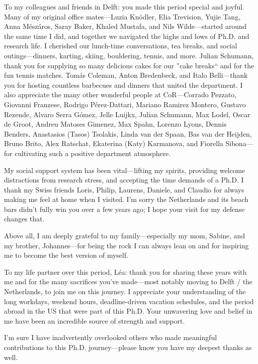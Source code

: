 To my colleagues and friends in Delft: you made this period special and joyful. Many of my original office mates—Luzia Knödler, Elia Trevision, Yujie Tang, Anna Mészáros, Saray Baker, Khaled Mustafa, and Nils Wilde—started around the same time I did, and together we navigated the highs and lows of Ph.D. and research life. I cherished our lunch-time conversations, tea breaks, and social outings—dinners, karting, skiing, bouldering, tennis, and more. Julian Schumann, thank you for supplying so many delicious cakes for our ''cake breaks`` and for the fun tennis matches.
Tomás Coleman, Anton Bredenbeck, and Italo Belli—thank you for hosting countless barbecues and dinners that united the department. I also appreciate the many other wonderful people at CoR—Corrado Pezzato, Giovanni Franzese, Rodrigo Pérez-Dattari, Mariano Ramirez Montero, Gustavo Rezende, Alvaro Serra Gómez, Jelle Luijkx, Julian Schumann, Max Lodel, Oscar de Groot, Andreu Matoses Gimenez, Max Spahn, Lorenzo Lyons, Dennis Benders, Anastasios (Tasos) Tsolakis, Linda van der Spaan, Bas van der Heijden, Bruno Brito, Alex Ratschat, Ekaterina (Katy) Karmanova, and Fiorella Sibona—for cultivating such a positive department atmosphere.

My social support system has been vital—lifting my spirits, providing welcome distractions from research stress, and accepting the time demands of a Ph.D. I thank my Swiss friends Loris, Philip, Laurens, Daniele, and Claudio for always making me feel at home when I visited. I’m sorry the Netherlands and its beach bars didn’t fully win you over a few years ago; I hope your visit for my defense changes that.

Above all, I am deeply grateful to my family—especially my mom, Sabine, and my brother, Johannes—for being the rock I can always lean on and for inspiring me to become the best version of myself.

To my life partner over this period, Léa: thank you for sharing these years with me and for the many sacrifices you’ve made—most notably moving to Delft / the Netherlands, to join me on this journey. I appreciate your understanding of the long workdays, weekend hours, deadline-driven vacation schedules, and the period abroad in the US that were part of this Ph.D. Your unwavering love and belief in me have been an incredible source of strength and support.

I’m sure I have inadvertently overlooked others who made meaningful contributions to this Ph.D. journey—please know you have my deepest thanks as well.



